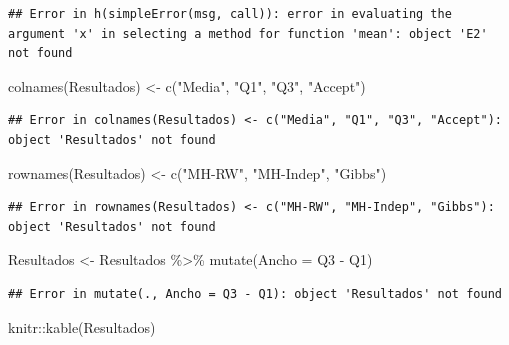 \documentclass[
  12pt,
]{book}
\newenvironment{Shaded}{\begin{snugshade}}{\end{snugshade}}
\newcommand{\AttributeTok}[1]{\textcolor[rgb]{0.77,0.63,0.00}{#1}}
\newcommand{\FunctionTok}[1]{\textcolor[rgb]{0.00,0.00,0.00}{#1}}
\newcommand{\NormalTok}[1]{#1}
\newcommand{\OtherTok}[1]{\textcolor[rgb]{0.56,0.35,0.01}{#1}}
\newcommand{\SpecialCharTok}[1]{\textcolor[rgb]{0.00,0.00,0.00}{#1}}
\newcommand{\StringTok}[1]{\textcolor[rgb]{0.31,0.60,0.02}{#1}}
\theoremstyle{definition}
\theoremstyle{definition}
\theoremstyle{definition}
\theoremstyle{definition}
\theoremstyle{remark}
\begin{document}
\begin{verbatim}
## Error in h(simpleError(msg, call)): error in evaluating the argument 'x' in selecting a method for function 'mean': object 'E2' not found
\end{verbatim}

\begin{Shaded}
\begin{Highlighting}[]
\FunctionTok{colnames}\NormalTok{(Resultados) }\OtherTok{\textless{}{-}} \FunctionTok{c}\NormalTok{(}\StringTok{"Media"}\NormalTok{, }\StringTok{"Q1"}\NormalTok{, }\StringTok{"Q3"}\NormalTok{, }\StringTok{"Accept"}\NormalTok{)}
\end{Highlighting}
\end{Shaded}

\begin{verbatim}
## Error in colnames(Resultados) <- c("Media", "Q1", "Q3", "Accept"): object 'Resultados' not found
\end{verbatim}

\begin{Shaded}
\begin{Highlighting}[]
\FunctionTok{rownames}\NormalTok{(Resultados) }\OtherTok{\textless{}{-}} \FunctionTok{c}\NormalTok{(}\StringTok{"MH{-}RW"}\NormalTok{, }\StringTok{"MH{-}Indep"}\NormalTok{, }\StringTok{"Gibbs"}\NormalTok{)}
\end{Highlighting}
\end{Shaded}

\begin{verbatim}
## Error in rownames(Resultados) <- c("MH-RW", "MH-Indep", "Gibbs"): object 'Resultados' not found
\end{verbatim}

\begin{Shaded}
\begin{Highlighting}[]
\NormalTok{Resultados }\OtherTok{\textless{}{-}}\NormalTok{ Resultados }\SpecialCharTok{\%\textgreater{}\%}
    \FunctionTok{mutate}\NormalTok{(}\AttributeTok{Ancho =}\NormalTok{ Q3 }\SpecialCharTok{{-}}\NormalTok{ Q1)}
\end{Highlighting}
\end{Shaded}

\begin{verbatim}
## Error in mutate(., Ancho = Q3 - Q1): object 'Resultados' not found
\end{verbatim}

\begin{Shaded}
\begin{Highlighting}[]
\NormalTok{knitr}\SpecialCharTok{::}\FunctionTok{kable}\NormalTok{(Resultados)}
\end{Highlighting}
\end{Shaded}
\end{document}
